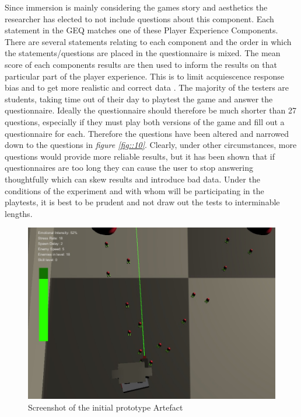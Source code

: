 \documentclass[journal]{IEEEtran}
\begin{document}
Since immersion is mainly considering the games story and aesthetics the researcher has elected to not include questions about this component.
Each statement in the GEQ matches one of these Player Experience Components. There are several statements relating to each component and the order in which the statements/questions are placed in the questionnaire is mixed. The mean score of each components results are then used to inform the results on that particular part of the player experience. This is to limit acquiescence response bias and to get more realistic and correct data \cite{winkler1982controlling}. 
The majority of the testers are students, taking time out of their day to playtest the game and answer the questionnaire. Ideally the questionnaire should therefore be much shorter than 27 questions, especially if they must play both versions of the game and fill out a questionnaire for each. Therefore the questions have been altered and narrowed down to the questions in \textit{figure \ref{fig::10}}. Clearly, under other circumstances, more questions would provide more reliable results, but it has been shown that if questionnaires are too long they can cause the user to stop answering thoughtfully which can skew results and introduce bad data. Under the conditions of the experiment and with whom will be participating in the playtests, it is best to be prudent and not draw out the tests to interminable lengths.




\begin{figure}[h]
	\includegraphics[width=1.0\linewidth]{artefactscreenshot.jpg}
	\caption{Screenshot of the initial prototype Artefact}
	\label{fig::2}
\end{figure} 
\end{document}
